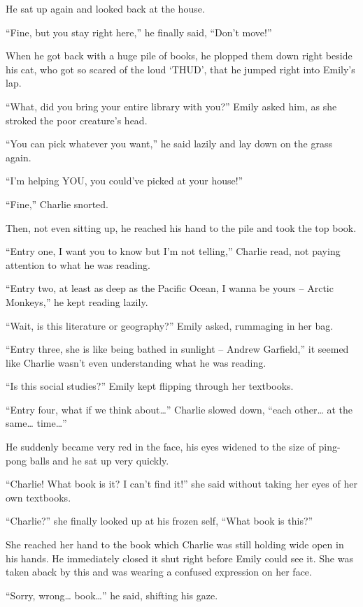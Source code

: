 He sat up again and looked back at the house.

“Fine, but you stay right here,” he finally said, “Don't move!”

\bigskip

When he got back with a huge pile of books, he plopped them down right beside his cat, who got so scared of the loud ‘THUD', that he jumped right into Emily's lap.

“What, did you bring your entire library with you?” Emily asked him, as she stroked the poor creature's head.

“You can pick whatever you want,” he said lazily and lay down on the grass again.

“I'm helping YOU, you could've picked at your house!”

“Fine,” Charlie snorted.

Then, not even sitting up, he reached his hand to the pile and took the top book.

“Entry one, I want you to know but I'm not telling,” Charlie read, not paying attention to what he was reading.

“Entry two, at least as deep as the Pacific Ocean, I wanna be yours – Arctic Monkeys,” he kept reading lazily.

“Wait, is this literature or geography?” Emily asked, rummaging in her bag.

“Entry three, she is like being bathed in sunlight – Andrew Garfield,” it seemed like Charlie wasn't even understanding what he was reading.

“Is this social studies?” Emily kept flipping through her textbooks.

“Entry four, what if we think about…” Charlie slowed down, “each other… at the same… time…”

He suddenly became very red in the face, his eyes widened to the size of ping-pong balls and he sat up very quickly.

“Charlie! What book is it? I can't find it!” she said without taking her eyes of her own textbooks.

“Charlie?” she finally looked up at his frozen self, “What book is this?”

She reached her hand to the book which Charlie was still holding wide open in his hands. He immediately closed it shut right before Emily could see it. She was taken aback by this and was wearing a confused expression on her face.

“Sorry, wrong… book…” he said, shifting his gaze.

